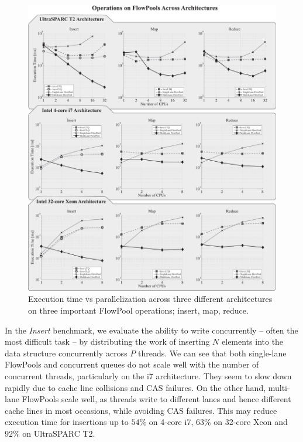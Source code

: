 \documentclass[runningheads,a4paper]{llncs}
\begin{document}
\begin{figure}[ht!]
\centering
\includegraphics[width=5in]{../benchmarks/graphs/scaling-operations}
\setlength{\abovecaptionskip}{0pt}
\setlength{\belowcaptionskip}{-20pt}
\caption{Execution time vs parallelization across three different
architectures on three important FlowPool operations; insert, map, 
reduce.}
\label{fig:eval-cpu-scaling}
\end{figure}

In the \emph{Insert} benchmark, we evaluate the ability to write
concurrently -- often the most difficult task -- by distributing the
work of inserting $N$ elements into the data structure concurrently
across $P$ threads.
We can see that both single-lane FlowPools and concurrent queues do
not scale well with the number of concurrent threads, particularly
on the i7 architecture. They seem to slow down rapidly due to cache
line collisions and CAS failures.
On the other hand, multi-lane FlowPools scale well, as threads
write to different lanes and hence different cache lines in
most occasions, while avoiding CAS failures. This may reduce execution
time for insertions up to $54\%$ on 4-core i7, $63\%$ on 32-core 
Xeon and $92\%$ on UltraSPARC T2.
\end{document}
